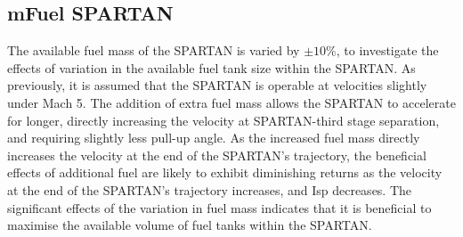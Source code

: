 \subsection{mFuel SPARTAN}

The available fuel mass of the SPARTAN is varied by $\pm 10\%$, to investigate the effects of variation in the available fuel tank size within the SPARTAN. As previously, it is assumed that the SPARTAN is operable at velocities slightly under Mach 5. 
 The addition of extra fuel mass allows the SPARTAN to accelerate for longer, directly increasing the velocity at SPARTAN-third stage separation, and requiring slightly less pull-up angle. 
As the increased fuel mass directly increases the velocity at the end of the SPARTAN's trajectory, the beneficial effects of additional fuel are likely to exhibit diminishing returns as the velocity at the end of the SPARTAN's trajectory increases, and Isp decreases.
The significant effects of the variation in fuel mass indicates that it is beneficial to maximise the available volume of fuel tanks within the SPARTAN. 


